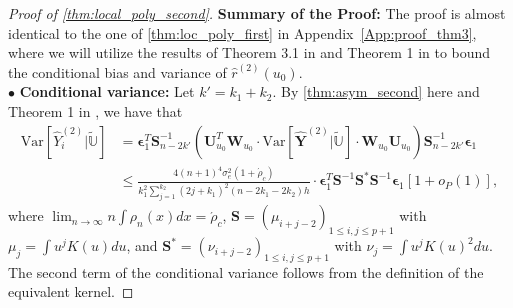 \documentclass{uwstat572}
\theoremstyle{definition}
\renewcommand{\hat}{\widehat}
\renewcommand{\tilde}{\widetilde}
\theoremstyle{theorem}
\begin{document}
\begin{proof}[Proof of \autoref{thm:local_poly_second}]
{\bf Summary of the Proof:} The proof is almost identical to the one of \autoref{thm:loc_poly_first} in Appendix~\ref{App:proof_thm3}, where we will utilize the results of Theorem 3.1 in \cite{fan1996local} and Theorem 1 in \cite{de2018local} to bound the conditional bias and variance of $\hat{r}^{(2)}(u_0)$.\\

$\bullet$ {\bf Conditional variance:} Let $k'=k_1+k_2$. By \autoref{thm:asym_second} here and Theorem 1 in \cite{de2018local}, we have that
\begin{align*}
\mathrm{Var}\left[\hat{Y}_i^{(2)} \big| \tilde{\mathbb{U}}\right] &= \bm{\epsilon}_1^T \bm{S}_{n-2k'}^{-1} \left(\bm{U}_{u_0}^T \bm{W}_{u_0} \cdot \mathrm{Var}\left[\hat{\bm{Y}}^{(2)} |\tilde{\mathbb{U}}\right] \cdot \bm{W}_{u_0} \bm{U}_{u_0} \right) \bm{S}_{n-2k'}^{-1} \bm{\epsilon}_1\\
&\leq \frac{4(n+1)^4\sigma_e^2(1+\acute{\rho}_c)}{k_1^2 \sum_{j=1}^{k_2}(2j+k_1)^2 (n-2k_1-2k_2) h}\cdot \bm{\epsilon}_1^T \bm{S}^{-1}\bm{S}^*\bm{S}^{-1}\bm{\epsilon}_1 \left[1+o_P(1)\right],
\end{align*}
where $\lim_{n\to \infty} n\int \rho_n(x) dx =\acute{\rho}_c$, $\bm{S}=\left(\mu_{i+j-2}\right)_{1\leq i,j\leq p+1}$ with $\mu_j=\int u^j K(u) du$, and $\bm{S}^*=\left(\nu_{i+j-2}\right)_{1\leq i,j\leq p+1}$ with $\nu_j = \int u^j K(u)^2 du$. The second term of the conditional variance follows from the definition of the equivalent kernel.


\end{proof}
\end{document}

